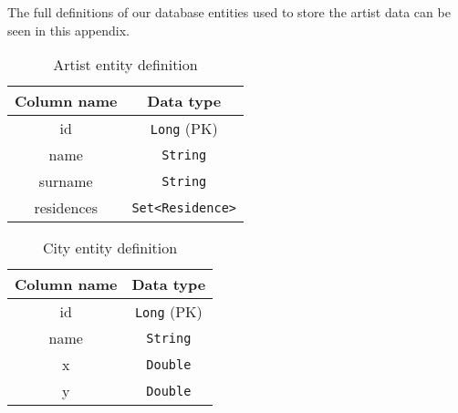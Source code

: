 The full definitions of our database entities used to store the artist data can be seen in this appendix.

\begin{table}[ht]
    \begin{center}
        \begin{tabular}{|c|c|}
            \hline
            Column name & Data type\\ \hline\hline
            id & \texttt{Long} (PK) \\\hline
            name & \texttt{String} \\\hline
            surname & \texttt{String} \\\hline
            residences & \texttt{Set<Residence>} \\\hline
        \end{tabular}
    \end{center}
    \caption{Artist entity definition}
    \label{tab:artist-entity}
\end{table}

\begin{table}[ht]
    \begin{center}
        \begin{tabular}{|c|c|}
            \hline
            Column name & Data type\\ \hline\hline
            id & \texttt{Long} (PK) \\\hline
            name & \texttt{String} \\\hline
            x & \texttt{Double} \\\hline
            y & \texttt{Double} \\\hline
        \end{tabular}
    \end{center}
    \caption{City entity definition}
    \label{tab:city-entity}
\end{table}

